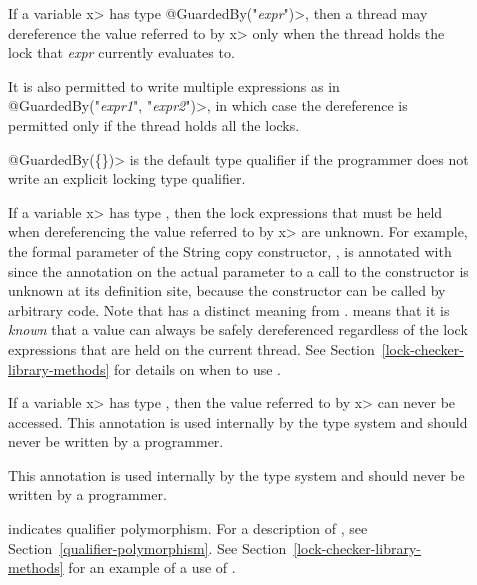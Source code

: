 \begin{description}

\item[]
  If a variable \<x> has type \<@GuardedBy("\emph{expr}")>, then a thread may
  dereference the value referred to by \<x> only when the thread holds the
  lock that \emph{expr} currently evaluates to.

  It is also permitted to write multiple expressions as in
  \<@GuardedBy(\ttlcb"\emph{expr1}", "\emph{expr2}"\ttrcb)>, in which case
  the dereference is
  permitted only if the thread holds all the locks.

  \<@GuardedBy(\{\})> is the default type qualifier if the programmer does not
  write an explicit locking type qualifier.

\item[]
  If a variable \<x> has type , then
  the lock expressions that must be held when
  dereferencing the value referred to by \<x> are unknown.
  For example, the formal parameter of the String copy constructor,
  , is annotated with  since
  the  annotation
  on the actual parameter to a call to the constructor is unknown
  at its definition site, because the constructor can be called by
  arbitrary code.
  Note that 
  has a distinct meaning from .  
  means that it is \emph{known} that a value can always be safely dereferenced
  regardless of the lock expressions that are held on the current thread.
  See Section~\ref{lock-checker-library-methods}
  for details on when to use .

\item[]
  If a variable \<x> has type , then
  the value referred to by \<x> can never be accessed.
  This annotation is used internally by the type system
  and should never be written by a programmer.

\item[]
  This annotation is used internally by the type system
  and should never be written by a programmer.

\item[]
  indicates qualifier polymorphism.  For a description of
  , see
  Section~\ref{qualifier-polymorphism}.
  See Section~\ref{lock-checker-library-methods}
  for an example of a use of .

\end{description}

